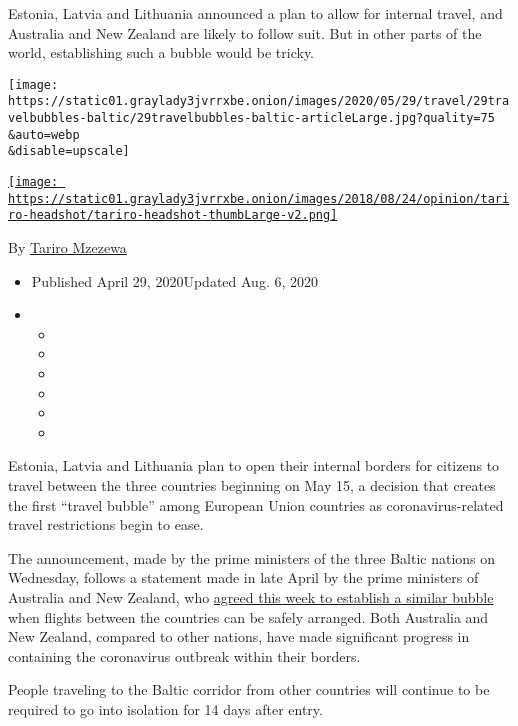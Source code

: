 Estonia, Latvia and Lithuania announced a plan to allow for internal
travel, and Australia and New Zealand are likely to follow suit. But in
other parts of the world, establishing such a bubble would be tricky.

\texttt{[image: https://static01.graylady3jvrrxbe.onion/images/2020/05/29/travel/29travelbubbles-baltic/29travelbubbles-baltic-articleLarge.jpg?quality=75\\\&auto=webp\\\&disable=upscale]}

\href{https://www.nytimes3xbfgragh.onion/by/tariro-mzezewa}{\texttt{[image: https://static01.graylady3jvrrxbe.onion/images/2018/08/24/opinion/tariro-headshot/tariro-headshot-thumbLarge-v2.png]}}

By \href{https://www.nytimes3xbfgragh.onion/by/tariro-mzezewa}{Tariro
Mzezewa}

\begin{itemize}
\item
  Published April 29, 2020Updated Aug. 6, 2020
\item
  \begin{itemize}
  \item
  \item
  \item
  \item
  \item
  \item
  \end{itemize}
\end{itemize}

Estonia, Latvia and Lithuania plan to open their internal borders for
citizens to travel between the three countries beginning on May 15, a
decision that creates the first ``travel bubble'' among European Union
countries as coronavirus-related travel restrictions begin to ease.

The announcement, made by the prime ministers of the three Baltic
nations on Wednesday, follows a statement made in late April by the
prime ministers of Australia and New Zealand, who
\href{https://www.theguardian.com/world/2020/may/05/trans-tasman-travel-bubble-to-allow-flights-as-soon-as-lockdowns-ease-morrison-and-ardern-agree}{agreed
this week to establish a similar bubble} when flights between the
countries can be safely arranged. Both Australia and New Zealand,
compared to other nations, have made significant progress in containing
the coronavirus outbreak within their borders.

People traveling to the Baltic corridor from other countries will
continue to be required to go into isolation for 14 days after entry.

